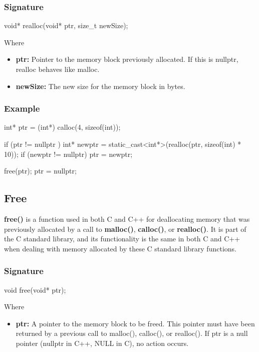 \documentclass{report}
\begin{document}
\begin{concept}
    \subsubsection{Signature}
    \bigbreak \noindent 
    \begin{cppcode}
    void* realloc(void* ptr, size_t newSize);
    \end{cppcode}
    \bigbreak \noindent 
    Where 
    \bigbreak \noindent 
    \begin{itemize}
        \item \textbf{ptr:} Pointer to the memory block previously allocated. If this is nullptr, realloc behaves like malloc.
        \item \textbf{newSize:} The new size for the memory block in bytes.
    \end{itemize}

    \bigbreak \noindent 
    \subsubsection{Example}
    \bigbreak \noindent 
    \begin{cppcode}
    int* ptr = (int*) calloc(4, sizeof(int));

    if (ptr != nullptr ) {
        int* newptr = static_cast<int*>(realloc(ptr, sizeof(int) * 10));
        if (newptr != nullptr) {
            ptr = newptr;
        } 
    }

    free(ptr);
    ptr = nullptr;
    \end{cppcode}
    

    \bigbreak \noindent 
    \subsection{Free}
    \bigbreak \noindent 
    \begin{concept}
        \textbf{free()} is a function used in both C and C++ for deallocating memory that was previously allocated by a call to \textbf{malloc()}, \textbf{calloc()}, or \textbf{realloc()}. It is part of the C standard library, and its functionality is the same in both C and C++ when dealing with memory allocated by these C standard library functions. 
    \end{concept}
    \bigbreak \noindent 
    \subsubsection{Signature}
    \bigbreak \noindent 
    \begin{cppcode}
    void free(void* ptr);
    \end{cppcode}
    \bigbreak \noindent 
    Where
    \begin{itemize}
        \item \textbf{ptr:} A pointer to the memory block to be freed. This pointer must have been returned by a previous call to malloc(), calloc(), or realloc(). If ptr is a null pointer (nullptr in C++, NULL in C), no action occurs.
    \end{itemize}
    


\end{concept}
\end{document}
